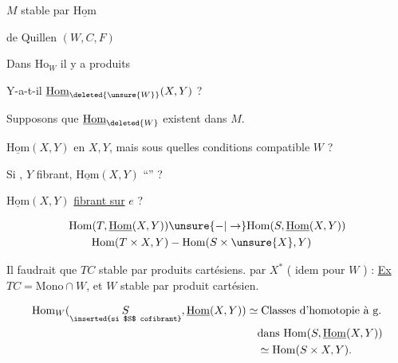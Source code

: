  $M$ stable par $\underline{\mathrm{Hom}}$

 de Quillen $(W,C,F)$

Dans  $\mathrm{Ho}_W$ il y a produits

Y-a-t-il $\underline{\mathrm{Hom}}_{\deleted{\unsure{W}}}(X,Y)$  ?

Supposons que $\underline{\mathrm{Hom}}_{\deleted{W}}$ existent dans $M$.

$\underline{\mathrm{Hom}}(X,Y)$  en $X,Y$, mais sous quelles conditions compatible  $W$ ?

Si , $Y$ fibrant, $\underline{\mathrm{Hom}}(X,Y)$ ``'' ?

$\underline{\mathrm{Hom}}(X,Y)$ \uline{fibrant sur} $e$ ?


\[
\begin{aligned}
\mathrm{Hom}(T,\underline{\mathrm{Hom}}(X,Y)) &\unsure{-|\to} \mathrm{Hom}(S,\underline{\mathrm{Hom}}(X,Y))\\
\mathrm{Hom}(T\times X,Y)&-\mathrm{Hom}(S\times \unsure{X},Y)
\end{aligned}
\]


Il faudrait que $TC$ stable par produits cartésiens. par $X^*$ (  idem pour $W$ ) : \uline{Ex} $TC=\mathrm{Mono}\cap W$, et $W$ stable par produit cartésien.

\[
\begin{aligned}
\mathrm{Hom}_W(\underset{\text{\scriptsize\inserted{si $S$ cofibrant}}}{S},\underline{\mathrm{Hom}}(X,Y))
 &\simeq \text{Classes d'homotopie à g.}\\
 &\quad\text{dans }\mathrm{Hom}(S,\underline{\mathrm{Hom}}(X,Y))\\
 &\quad\simeq\mathrm{Hom}(S\times X,Y).
\end{aligned}
\]

